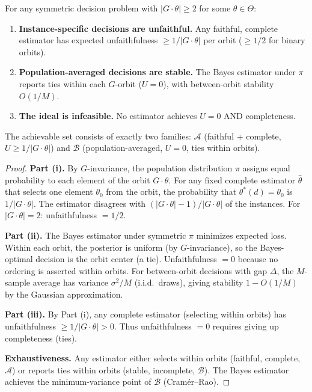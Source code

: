 \documentclass{jmlr}
\begin{document}
\begin{theorem}
\label{thm:bayes-dichotomy}
For any symmetric decision problem with $|G \cdot \theta| \geq 2$ for some $\theta \in \Theta$:
\begin{enumerate}
    \item[(i)] \textbf{Instance-specific decisions are unfaithful.} Any faithful, complete estimator has expected unfaithfulness $\geq 1/|G \cdot \theta|$ per orbit ($\geq 1/2$ for binary orbits).
    \item[(ii)] \textbf{Population-averaged decisions are stable.} The Bayes estimator under $\pi$ reports ties within each $G$-orbit ($U = 0$), with between-orbit stability $O(1/M)$.
    \item[(iii)] \textbf{The ideal is infeasible.} No estimator achieves $U = 0$ AND completeness.
\end{enumerate}
The achievable set consists of exactly two families: $\mathcal{A}$ (faithful + complete, $U \geq 1/|G \cdot \theta|$) and $\mathcal{B}$ (population-averaged, $U = 0$, ties within orbits).
\end{theorem}

\begin{proof}
\textbf{Part (i).} By $G$-invariance, the population distribution $\pi$ assigns equal probability to each element of the orbit $G \cdot \theta$. For any fixed complete estimator $\hat\theta$ that selects one element $\theta_0$ from the orbit, the probability that $\theta^*(d) = \theta_0$ is $1/|G \cdot \theta|$. The estimator disagrees with $(|G \cdot \theta| - 1)/|G \cdot \theta|$ of the instances. For $|G \cdot \theta| = 2$: unfaithfulness $= 1/2$.

\textbf{Part (ii).} The Bayes estimator under symmetric $\pi$ minimizes expected loss. Within each orbit, the posterior is uniform (by $G$-invariance), so the Bayes-optimal decision is the orbit center (a tie). Unfaithfulness $= 0$ because no ordering is asserted within orbits. For between-orbit decisions with gap $\Delta$, the $M$-sample average has variance $\sigma^2/M$ (i.i.d.\ draws), giving stability $1 - O(1/M)$ by the Gaussian approximation.

\textbf{Part (iii).} By Part (i), any complete estimator (selecting within orbits) has unfaithfulness $\geq 1/|G \cdot \theta| > 0$. Thus unfaithfulness $= 0$ requires giving up completeness (ties).

\textbf{Exhaustiveness.} Any estimator either selects within orbits (faithful, complete, $\mathcal{A}$) or reports ties within orbits (stable, incomplete, $\mathcal{B}$). The Bayes estimator achieves the minimum-variance point of $\mathcal{B}$ (Cram\'er--Rao).
\end{proof}
\end{document}
